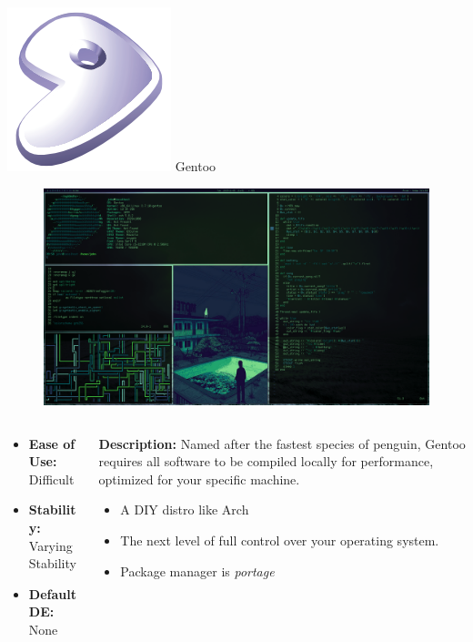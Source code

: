 \documentclass[11pt]{beamer}
\begin{document}
\begin{frame}{\includegraphics[scale=0.07]{gentoo-logo.png} Gentoo}
	\begin{figure}
		\includegraphics[scale=0.1]{gentoo-screenshot.png}
	\end{figure}
	\begin{columns}
		\small
		\begin{column}{0.35\textwidth}
			\begin{itemize}
				\item \textbf{Ease of Use:} Difficult
				\item \textbf{Stability:} Varying Stability
				\item \textbf{Default DE:} None
			\end{itemize}
		\end{column}
		\begin{column}{0.65\textwidth}
			\small
			\textbf{Description:} Named after the fastest species of penguin, Gentoo requires all software to be compiled locally for performance, optimized for your specific machine.
			\begin{itemize}
				\item A DIY distro like Arch
				\item The next level of full control over your operating system.
				\item Package manager is \textit{portage}
			\end{itemize}
		\end{column}
	\end{columns}
\end{frame}
\end{document}
